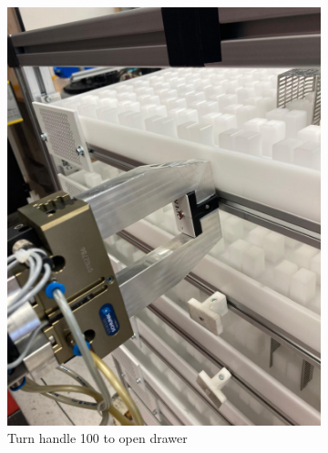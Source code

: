 \begin{figure}[!ht]
\begin{subfigure}[b]{0.32\textwidth}
        \includegraphics[width=\textwidth]{figures/shelf-control/open-handle.jpeg}
        \caption{Turn handle 100\textdegree{} to open drawer}
        \vspace{-0.45cm}
        \label{subfig:turn-open}
    \end{subfigure}\hspace{0.1cm}
    \begin{subfigure}[b]{0.32\textwidth}
        \centering

\end{subfigure}
\end{figure}
